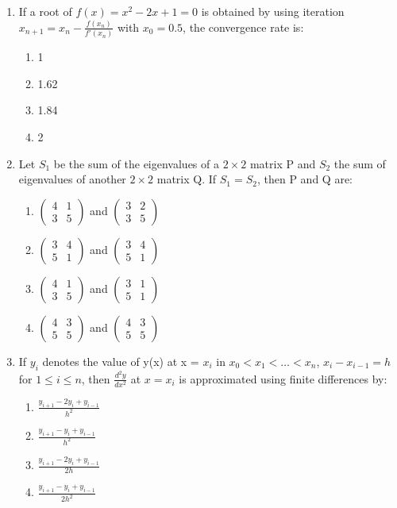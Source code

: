 \documentclass[journal,cmex10]{IEEEtran}
\theoremstyle{remark}
\newcommand{\myvec}[1]{\ensuremath{\begin{pmatrix}#1\end{pmatrix}}}
\numberwithin{equation}{enumi}
\numberwithin{figure}{enumi}
\begin{document}
\begin{enumerate}[label=\arabic*)]
    \item If a root of $f(x) = x^2 - 2x + 1 = 0$ is obtained by using iteration $x_{n+1} = x_n - \frac{f(x_n)}{f'(x_n)}$ with $x_0 = 0.5$, the convergence rate is:
    \bigskip
   \hfill {}
    \begin{enumerate}[label=\alph*)]
        \item 1
        \item 1.62
        \item 1.84
        \item 2
    \end{enumerate}
    \bigskip

    \item Let $S_1$ be the sum of the eigenvalues of a $2 \times 2$ matrix P and $S_2$ the sum of eigenvalues of another $2 \times 2$ matrix Q. If $S_1 = S_2$, then P and Q  are:
    \bigskip
    \hfill {}
    \begin{enumerate}[label=\alph*)]
        \item $\myvec{4 & 1 \\ 3 & 5}$ and $\myvec{ 3 & 2 \\ 3 & 5}$
        \vspace{5mm}
        \item $\myvec{3 & 4 \\ 5 & 1 }$ and $\myvec{3 & 4 \\ 5 & 1 }$
        \vspace{5mm}
        \item $\myvec{4 & 1 \\ 3 & 5 }$ and $\myvec{3 & 1 \\ 5 & 1 }$
        \vspace{5mm}
        \item $\myvec{4 & 3 \\ 5 & 5 }$ and $\myvec{4 & 3 \\ 5 & 5 }$
    \end{enumerate}
    \bigskip

    \item If $y_i$ denotes the value of y(x) at x = $x_i$ in  $x_0 < x_1 < \dots < x_n$, $x_i - x_{i-1} = h$ for $1 \le i \le n$, then  $\frac{d^2 y}{dx^2}$ at $x = x_i$ is approximated using finite differences by:
    \bigskip
    \hfill {}
    \begin{enumerate}[label=\alph*)]
        \item $\frac{y_{i+1} - 2y_i + y_{i-1}}{h^2}$
        \vspace{0.1cm}
        \item $\frac{y_{i+1} - y_i + y_{i-1}}{h^2}$
        \vspace{0.1cm}
        \item $\frac{y_{i+1} - 2y_i + y_{i-1}}{2h}$
        \vspace{0.1cm}
        \item $\frac{y_{i+1} - y_i + y_{i-1}}{2h^2}$
    \end{enumerate}
    \bigskip


\end{enumerate}
\end{document}
